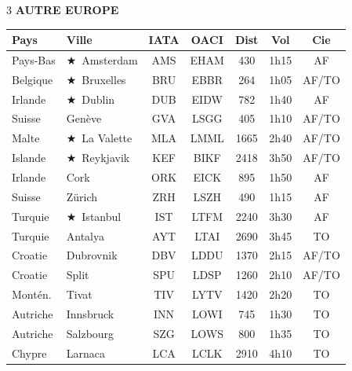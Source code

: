 \documentclass[9pt,a4paper,landscape]{article}
\newcommand{\sectionbanner}[2]{%
\noindent\colorbox{#1}{\parbox{\dimexpr\textwidth-2\fboxsep}{%
\vspace{3pt}\hspace{6pt}{\Large\bfseries\color{white}#2}\vspace{3pt}}}%
\vspace{4pt}%
}
\newcommand{\CAP}{\textcolor{capgold}{$\bigstar$}}
\begin{document}
\begin{multicols}{3}
\vspace{0.15cm}
\textbf{\color{eurblue}AUTRE EUROPE}\\[-0.1cm]
\begin{tabular}{@{}l l c c c c c@{}}
\toprule
\textbf{Pays} & \textbf{Ville} & \textbf{IATA} & \textbf{OACI} & \textbf{Dist} & \textbf{Vol} & \textbf{Cie} \\
\midrule
\rowcolor{eurlight} Pays-Bas & \CAP\ Amsterdam & AMS & EHAM & 430 & 1h15 & AF \\
Belgique & \CAP\ Bruxelles & BRU & EBBR & 264 & 1h05 & AF/TO \\
\rowcolor{eurlight} Irlande & \CAP\ Dublin & DUB & EIDW & 782 & 1h40 & AF \\
Suisse & Genève & GVA & LSGG & 405 & 1h10 & AF/TO \\
\rowcolor{eurlight} Malte & \CAP\ La Valette & MLA & LMML & 1665 & 2h40 & AF/TO \\
Islande & \CAP\ Reykjavik & KEF & BIKF & 2418 & 3h50 & AF/TO \\
\rowcolor{eurlight} Irlande & Cork & ORK & EICK & 895 & 1h50 & AF \\
Suisse & Zürich & ZRH & LSZH & 490 & 1h15 & AF \\
\rowcolor{eurlight} Turquie & \CAP\ Istanbul & IST & LTFM & 2240 & 3h30 & AF \\
Turquie & Antalya & AYT & LTAI & 2690 & 3h45 & TO \\
\rowcolor{eurlight} Croatie & Dubrovnik & DBV & LDDU & 1370 & 2h15 & AF/TO \\
Croatie & Split & SPU & LDSP & 1260 & 2h10 & AF/TO \\
\rowcolor{eurlight} Montén. & Tivat & TIV & LYTV & 1420 & 2h20 & TO \\
Autriche & Innsbruck & INN & LOWI & 745 & 1h30 & TO \\
\rowcolor{eurlight} Autriche & Salzbourg & SZG & LOWS & 800 & 1h35 & TO \\
Chypre & Larnaca & LCA & LCLK & 2910 & 4h10 & TO \\
\bottomrule
\end{tabular}
\end{multicols}

\sectionbanner{afrgreen}{AFRIQUE DU NORD}
\end{document}
